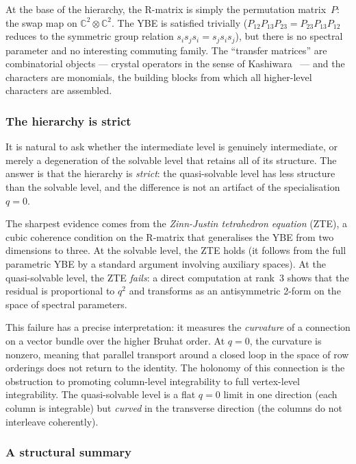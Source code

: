 At the base of the hierarchy, the R-matrix is simply the permutation
matrix~$P$: the swap map on $\mathbb{C}^2 \otimes \mathbb{C}^2$.
The YBE is satisfied trivially ($P_{12} P_{13} P_{23} =
P_{23} P_{13} P_{12}$ reduces to the symmetric group relation
$s_i s_j s_i = s_j s_i s_j$), but there is no spectral parameter and
no interesting commuting family.  The ``transfer matrices'' are
combinatorial objects --- crystal operators in the sense of
Kashiwara~\cite{kashiwara-1990} --- and the characters are monomials,
the building blocks from which all higher-level characters are
assembled.

\subsubsection*{The hierarchy is strict}

It is natural to ask whether the intermediate level is genuinely
intermediate, or merely a degeneration of the solvable level that
retains all of its structure.  The answer is that the hierarchy is
\emph{strict}: the quasi-solvable level has less structure than the
solvable level, and the difference is not an artifact of the
specialisation $q = 0$.

The sharpest evidence comes from the \emph{Zinn-Justin tetrahedron
equation} (ZTE), a cubic coherence condition on the R-matrix that
generalises the YBE from two dimensions to three.  At the solvable
level, the ZTE holds (it follows from the full parametric YBE by a
standard argument involving auxiliary spaces).  At the quasi-solvable
level, the ZTE \emph{fails}: a direct computation at rank~$3$ shows
that the residual is proportional to $q^2$ and transforms as an
antisymmetric 2-form on the space of spectral parameters.

This failure has a precise interpretation: it measures the
\emph{curvature} of a connection on a vector bundle over the higher
Bruhat order.  At $q = 0$, the curvature is nonzero, meaning that
parallel transport around a closed loop in the space of row orderings
does not return to the identity.  The holonomy of this connection is
the obstruction to promoting column-level integrability to full
vertex-level integrability.  The quasi-solvable level is a flat
$q = 0$ limit in one direction (each column is integrable) but
\emph{curved} in the transverse direction (the columns do not
interleave coherently).

\subsubsection*{A structural summary}

